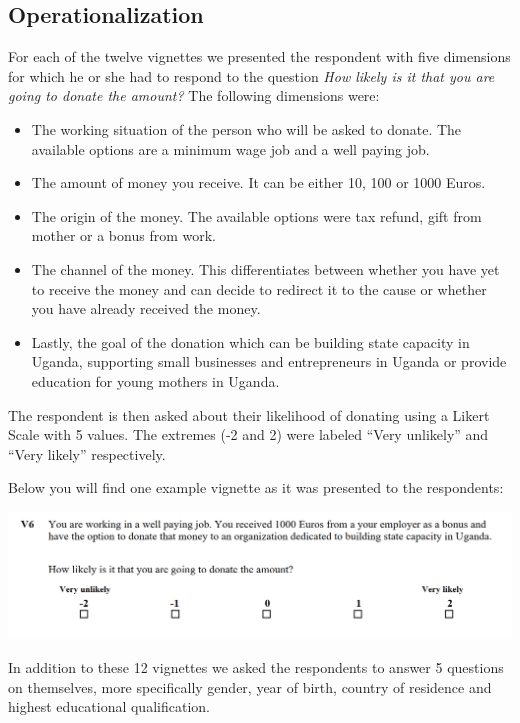 \documentclass[
  12pt,
]{article}
\providecommand{\tightlist}{%
  \setlength{\itemsep}{0pt}\setlength{\parskip}{0pt}}
\begin{document}
\hypertarget{operationalization}{%
\subsection{Operationalization}\label{operationalization}}

For each of the twelve vignettes we presented the respondent with five
dimensions for which he or she had to respond to the question \emph{How
likely is it that you are going to donate the amount?} The following
dimensions were:

\begin{itemize}
\tightlist
\item
  The working situation of the person who will be asked to donate. The
  available options are a minimum wage job and a well paying job.
\item
  The amount of money you receive. It can be either 10, 100 or 1000
  Euros.
\item
  The origin of the money. The available options were tax refund, gift
  from mother or a bonus from work.
\item
  The channel of the money. This differentiates between whether you have
  yet to receive the money and can decide to redirect it to the cause or
  whether you have already received the money.
\item
  Lastly, the goal of the donation which can be building state capacity
  in Uganda, supporting small businesses and entrepreneurs in Uganda or
  provide education for young mothers in Uganda.
\end{itemize}

The respondent is then asked about their likelihood of donating using a
Likert Scale with 5 values. The extremes (-2 and 2) were labeled ``Very
unlikely'' and ``Very likely'' respectively.

Below you will find one example vignette as it was presented to the
respondents:

\includegraphics[width=1.05\linewidth]{Screenshot_vignette}

In addition to these 12 vignettes we asked the respondents to answer 5
questions on themselves, more specifically gender, year of birth,
country of residence and highest educational qualification.
\end{document}
